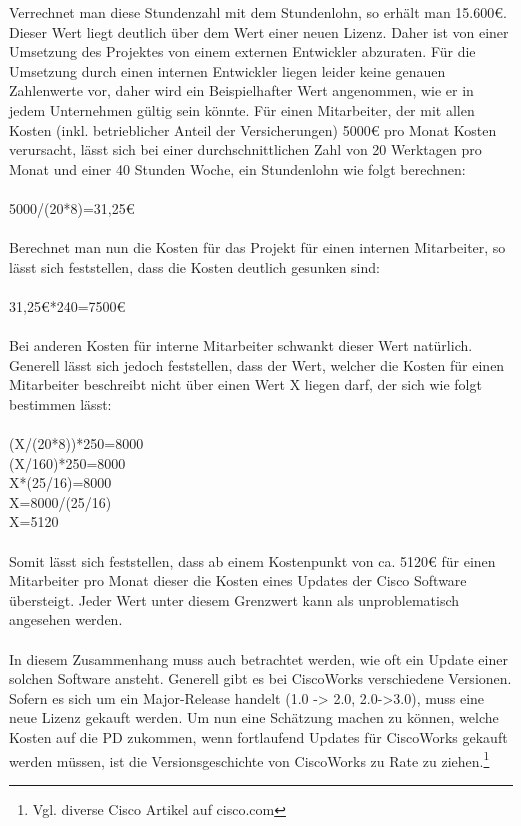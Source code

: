 Verrechnet man diese Stundenzahl mit dem Stundenlohn, so erhält man 15.600€. Dieser Wert liegt deutlich über dem Wert einer neuen Lizenz. Daher ist von einer Umsetzung des Projektes von einem externen Entwickler abzuraten. Für die Umsetzung durch einen internen Entwickler liegen leider keine genauen Zahlenwerte vor, daher wird ein Beispielhafter Wert angenommen, wie er in jedem Unternehmen gültig sein könnte. Für einen Mitarbeiter, der mit allen Kosten (inkl. betrieblicher Anteil der Versicherungen) 5000€ pro Monat Kosten verursacht, lässt sich bei einer durchschnittlichen Zahl von 20 Werktagen pro Monat und einer 40 Stunden Woche, ein Stundenlohn wie folgt berechnen:\\
\\
5000/(20*8)=31,25€\\
\\
Berechnet man nun die Kosten für das Projekt für einen internen Mitarbeiter, so lässt sich feststellen, dass die Kosten deutlich gesunken sind:\\
\\
31,25€*240=7500€\\
\\
Bei anderen Kosten für interne Mitarbeiter schwankt dieser Wert natürlich. Generell lässt sich jedoch feststellen, dass der Wert, welcher die Kosten für einen Mitarbeiter beschreibt nicht über einen Wert X liegen darf, der sich wie folgt bestimmen lässt:\\
\\
(X/(20*8))*250=8000\\
(X/160)*250=8000\\
X*(25/16)=8000\\
X=8000/(25/16)\\
X=5120\\
\\
Somit lässt sich feststellen, dass ab einem Kostenpunkt von ca. 5120€ für einen Mitarbeiter pro Monat dieser die Kosten eines Updates der Cisco Software übersteigt.
Jeder Wert unter diesem Grenzwert kann als unproblematisch angesehen werden.\\\\
In diesem Zusammenhang muss auch betrachtet werden, wie oft ein Update einer solchen Software ansteht.
Generell gibt es bei CiscoWorks verschiedene Versionen.
Sofern es sich um ein Major-Release handelt (1.0 -> 2.0, 2.0->3.0), muss eine neue Lizenz gekauft werden.
Um nun eine Schätzung machen zu können, welche Kosten auf die PD zukommen, wenn fortlaufend Updates für CiscoWorks gekauft werden müssen, ist die Versionsgeschichte von CiscoWorks zu Rate zu ziehen.\footnote{Vgl. diverse Cisco Artikel auf cisco.com}
